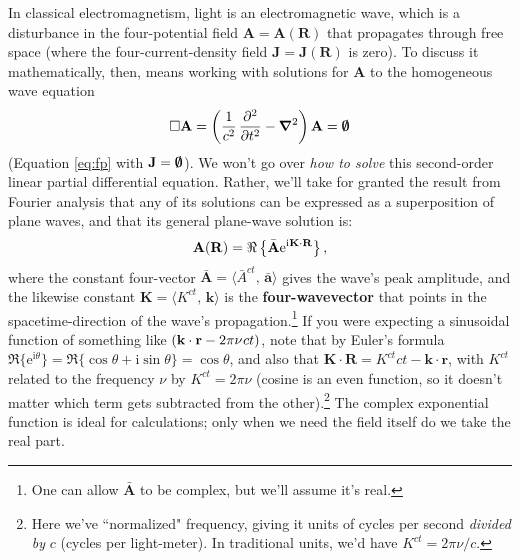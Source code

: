 \documentclass[12pt]{article}
\renewcommand{\vv}[1]{\mathbf{#1}}
\newcommand{\del}{\boldsymbol{\nabla}}
\begin{document}
In classical electromagnetism, light is an electromagnetic wave, which is a disturbance in the four-potential field $\vv A = \vv A (\vv R)$ that propagates through free space (where the four-current-density field $\vv J = \vv J (\vv R)$ is zero). To discuss it mathematically, then, means working with solutions for $\vv A$ to the homogeneous wave equation
\begin{equation*}
\Box \vv A =  \left( \dfrac{1}{c^2} \, \dfrac{\partial^2}{\partial t^2} - \del^2 \right) \vv A = \textrm{\mbox{\boldmath $\emptyset$}}
\end{equation*}
(Equation \ref{eq:fp} with $\vv J = \textrm{\mbox{\boldmath$\emptyset$}}$). We won't go over \emph{how to solve} this second-order linear partial differential equation. Rather, we'll take for granted the result from Fourier analysis that any of its solutions can be expressed as a superposition of plane waves, and that its general plane-wave solution is:
\begin{equation}\label{eq:pw}
\vv A (\vv R) = \Re \left \lbrace \bar{\vv A} \mathrm{e}^{\mathrm{i} \mkern.5mu \vv K \cdot \vv R} \right \rbrace ,
\end{equation}
where the constant four-vector $\bar{\vv A} = \langle \bar{A}^{ct}, \, \bar{\vv a} \rangle$ gives the wave's peak amplitude, and the likewise constant ${\vv K = \langle K^{ct}, \, \vv k \rangle}$ is the \textbf{four-wavevector} that points in the spacetime-direction of the wave's propagation.\footnote{One can allow $\bar{\vv A}$ to be complex, but we'll assume it's real.} If you were expecting a sinusoidal function of something like $(\vv k \cdot \vv r - 2 \pi \nu \mkern1mu ct )$, note that by Euler's formula ${\Re \lbrace \mathrm{e}^{\mathrm{i} \theta} \rbrace = \Re \lbrace \cos \theta + \mathrm{i} \sin \theta \rbrace = \cos \theta}$, and also that $\vv K \cdot \vv R = K^{ct}ct - \vv k \cdot \vv r$, with $K^{ct}$ related to the frequency $\nu$ by $K^{ct} = 2 \pi \nu$ (cosine is an even function, so it doesn't matter which term gets subtracted from the other).\footnote{Here we've ``normalized" frequency, giving it units of cycles per second \emph{divided by} $c$ (cycles per light-meter). In traditional units, we'd have $K^{ct} = 2 \pi \nu / c$.} The complex exponential function is ideal for calculations; only when we need the field itself do we take the real part.
\end{document}

